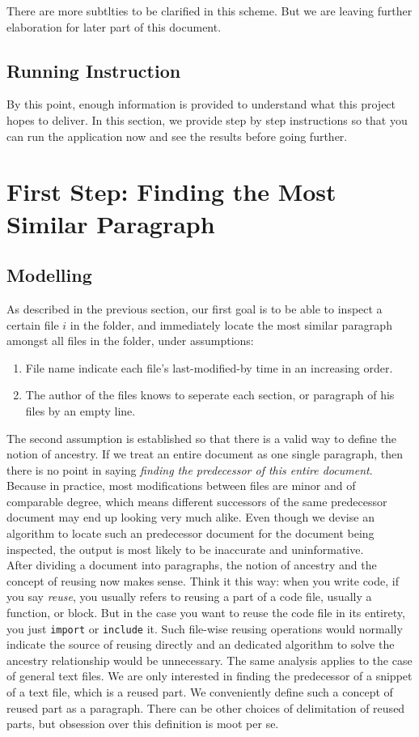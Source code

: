 \documentclass{article}
\begin{document}
There are more subtlties to be clarified in this scheme. But we are leaving further elaboration for later part of this document. 

\subsection{Running Instruction}
By this point, enough information is provided to understand what this project hopes to deliver. In this section, we provide step by step instructions so that you can run the application now and see the results before going further. 

\section{First Step: Finding the Most Similar Paragraph}
\subsection{Modelling}
As described in the previous section, our first goal is to be able to inspect a certain file $i$ in the folder, and immediately locate the most similar paragraph amongst all files in the folder, under assumptions:
\begin{enumerate}
  \item File name indicate each file's last-modified-by time in an increasing order.
  \item The author of the files knows to seperate each section, or paragraph of his files by an empty line. 
\end{enumerate}

The second assumption is established so that there is a valid way to define the notion of ancestry. If we treat an entire document as one single paragraph, then there is no point in saying \textit{finding the predecessor of this entire document}. Because in practice, most modifications between files are minor and of comparable degree, which means different successors of the same predecessor document may end up looking very much alike. Even though we devise an algorithm to locate such an predecessor document for the document being inspected, the output is most likely to be inaccurate and uninformative. \\

After dividing a document into paragraphs, the notion of ancestry and the concept of reusing now makes sense. Think it this way: when you write code, if you say \textit{reuse}, you usually refers to reusing a part of a code file, usually a function, or block. But in the case you want to reuse the code file in its entirety, you just \texttt{import} or \texttt{include} it. Such file-wise reusing operations would normally indicate the source of reusing directly and an dedicated algorithm to solve the ancestry relationship would be unnecessary. The same analysis applies to the case of general text files. We are only interested in finding the predecessor of a snippet of a text file, which is a reused part. We conveniently define such a concept of reused part as a paragraph. There can be other choices of delimitation of reused parts, but obsession over this definition is moot per se. \\
\end{document}
